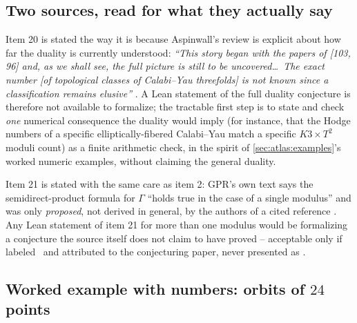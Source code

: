 \subsection{Two sources, read for what they actually say}

Item 20 is stated the way it is because Aspinwall's review is explicit about how far the
duality is currently understood: \emph{``This story began with the papers of [103, 96]
and, as we shall see, the full picture is still to be uncovered\ldots\ The exact number
[of topological classes of Calabi--Yau threefolds] is not known since a classification
remains elusive''} . A Lean statement of the full duality
conjecture is therefore not available to formalize; the tractable first step is to state
and check \emph{one} numerical consequence the duality would imply (for instance, that the
Hodge numbers of a specific elliptically-fibered Calabi--Yau match a specific $K3\times
T^2$ moduli count) as a finite arithmetic check, in the spirit of
\cref{sec:atlas:examples}'s worked numeric examples, without claiming the general duality.

Item 21 is stated with the same care as item 2: GPR's own text says the semidirect-product
formula for $\Gamma$ ``holds true in the case of a single modulus'' and was only
\emph{proposed}, not derived in general, by the authors of a cited reference
. Any Lean statement of item 21 for more than one modulus
would be formalizing a conjecture the source itself does not claim to have proved --
acceptable only if labeled \TC\ and attributed to the conjecturing paper, never presented
as \TL.

\subsection{Worked example with numbers: orbits of $24$ points}\label{sec:open:orbits}

